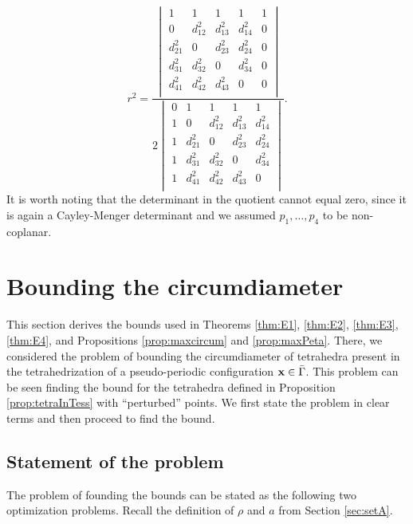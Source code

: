 \begin{equation}\label{eq:Cayley-Menger-expanded}
r^2 
=
\frac{
\begin{vmatrix}
1 & 1 & 1 & 1 & 1 \\
0 & d^2_{12} & d^2_{13} & d^2_{14} & 0 \\
d^2_{21} & 0 & d^2_{23} & d^2_{24} & 0 \\
d^2_{31} & d^2_{32} & 0 & d^2_{34} & 0 \\ 
d^2_{41} & d^2_{42} & d^2_{43} & 0 & 0 \\
\end{vmatrix}}
{2 \begin{vmatrix}
0 & 1 & 1 & 1 & 1 \\
1 & 0 & d^2_{12} & d^2_{13} & d^2_{14} \\
1 & d^2_{21} & 0 & d^2_{23} & d^2_{24} \\
1 & d^2_{31} & d^2_{32} & 0 & d^2_{34} \\ 
1 & d^2_{41} & d^2_{42} & d^2_{43} & 0 \\
\end{vmatrix} 
}.
\end{equation}
It is worth noting that the determinant in the quotient cannot equal zero, since it is again a Cayley-Menger determinant and we assumed $p_1,\dots,p_4$ to be non-coplanar. 



\section{Bounding the circumdiameter}\label{sec:boundingdiameter}
This section derives the bounds used in Theorems \ref{thm:E1}, \ref{thm:E2}, \ref{thm:E3}, \ref{thm:E4}, and Propositions \ref{prop:maxcircum} and \ref{prop:maxPeta}. There, we considered the problem of bounding the circumdiameter of tetrahedra present in the tetrahedrization of a pseudo-periodic configuration ${\mathbf{x}} \in \bar\Gamma$. This problem can be seen finding the bound for the tetrahedra defined in Proposition \ref{prop:tetraInTess}  with ``perturbed'' points. We first state the problem in clear terms and then proceed to find the bound.

\subsection{Statement of the problem}
The problem of founding the bounds can be stated as the following two optimization problems. Recall the definition of $\rho$ and $a$ from Section \ref{sec:setA}. \newline

